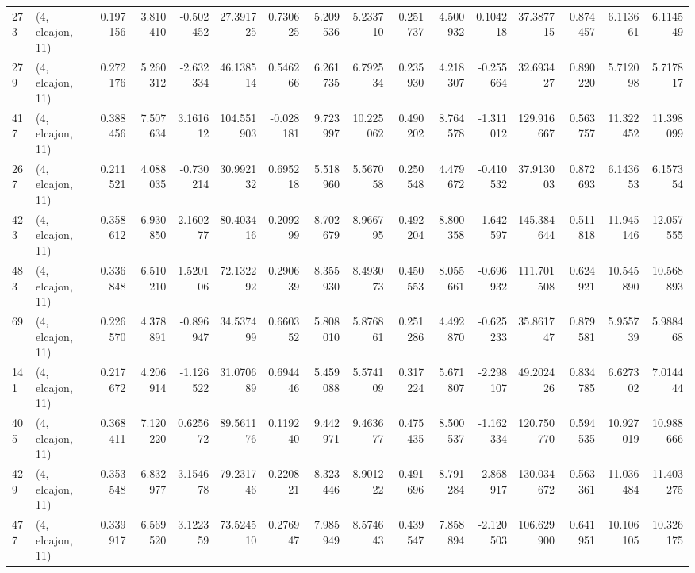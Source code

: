 \begin{tabular}{llrrrrrrrrrrrrrr}
273 &  (4, elcajon, 11) &   0.197156 &   3.810410 &  -0.502452 &    27.391725 &   0.730625 &   5.209536 &   5.233710 &  0.251737 &   4.500932 &   0.104218 &    37.387715 &  0.874457 &   6.113661 &   6.114549 \\
279 &  (4, elcajon, 11) &   0.272176 &   5.260312 &  -2.632334 &    46.138514 &   0.546266 &   6.261735 &   6.792534 &  0.235930 &   4.218307 &  -0.255664 &    32.693427 &  0.890220 &   5.712098 &   5.717817 \\
417 &  (4, elcajon, 11) &   0.388456 &   7.507634 &   3.161612 &   104.551903 &  -0.028181 &   9.723997 &  10.225062 &  0.490202 &   8.764578 &  -1.311012 &   129.916667 &  0.563757 &  11.322452 &  11.398099 \\
267 &  (4, elcajon, 11) &   0.211521 &   4.088035 &  -0.730214 &    30.992132 &   0.695218 &   5.518960 &   5.567058 &  0.250548 &   4.479672 &  -0.410532 &    37.913003 &  0.872693 &   6.143653 &   6.157354 \\
423 &  (4, elcajon, 11) &   0.358612 &   6.930850 &   2.160277 &    80.403416 &   0.209299 &   8.702679 &   8.966795 &  0.492204 &   8.800358 &  -1.642597 &   145.384644 &  0.511818 &  11.945146 &  12.057555 \\
483 &  (4, elcajon, 11) &   0.336848 &   6.510210 &   1.520106 &    72.132292 &   0.290639 &   8.355930 &   8.493073 &  0.450553 &   8.055661 &  -0.696932 &   111.701508 &  0.624921 &  10.545890 &  10.568893 \\
69  &  (4, elcajon, 11) &   0.226570 &   4.378891 &  -0.896947 &    34.537499 &   0.660352 &   5.808010 &   5.876861 &  0.251286 &   4.492870 &  -0.625233 &    35.861747 &  0.879581 &   5.955739 &   5.988468 \\
141 &  (4, elcajon, 11) &   0.217672 &   4.206914 &  -1.126522 &    31.070689 &   0.694446 &   5.459088 &   5.574109 &  0.317224 &   5.671807 &  -2.298107 &    49.202426 &  0.834785 &   6.627302 &   7.014444 \\
405 &  (4, elcajon, 11) &   0.368411 &   7.120220 &   0.625672 &    89.561176 &   0.119240 &   9.442971 &   9.463677 &  0.475435 &   8.500537 &  -1.162334 &   120.750770 &  0.594535 &  10.927019 &  10.988666 \\
429 &  (4, elcajon, 11) &   0.353548 &   6.832977 &   3.154678 &    79.231746 &   0.220821 &   8.323446 &   8.901222 &  0.491696 &   8.791284 &  -2.868917 &   130.034672 &  0.563361 &  11.036484 &  11.403275 \\
477 &  (4, elcajon, 11) &   0.339917 &   6.569520 &   3.122359 &    73.524510 &   0.276947 &   7.985949 &   8.574643 &  0.439547 &   7.858894 &  -2.120503 &   106.629900 &  0.641951 &  10.106105 &  10.326175 \\

\end{tabular}
